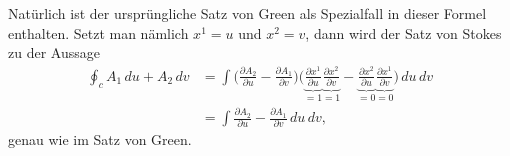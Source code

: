 Natürlich ist der ursprüngliche Satz von Green als Spezialfall in dieser
Formel enthalten.
Setzt man nämlich $x^1=u$ und $x^2=v$, dann wird der Satz von Stokes zu
der Aussage
\begin{align*}
\oint_c A_1\,du + A_2\,dv
&=
\int
\biggl(
\frac{\partial A_2}{\partial u}-\frac{\partial A_1}{\partial v}
\biggr)
\biggl(
\underbrace{\frac{\partial x^1}{\partial u}}_{\displaystyle=1}
\underbrace{\frac{\partial x^2}{\partial v}}_{\displaystyle=1}
-
\underbrace{\frac{\partial x^2}{\partial u}}_{\displaystyle=0}
\underbrace{\frac{\partial x^1}{\partial v}}_{\displaystyle=0}
\biggr)
\,du\,dv
\\
&=
\int
\frac{\partial A_2}{\partial u}-\frac{\partial A_1}{\partial v}
\,du\,dv,
\end{align*}
genau wie im Satz von Green.

